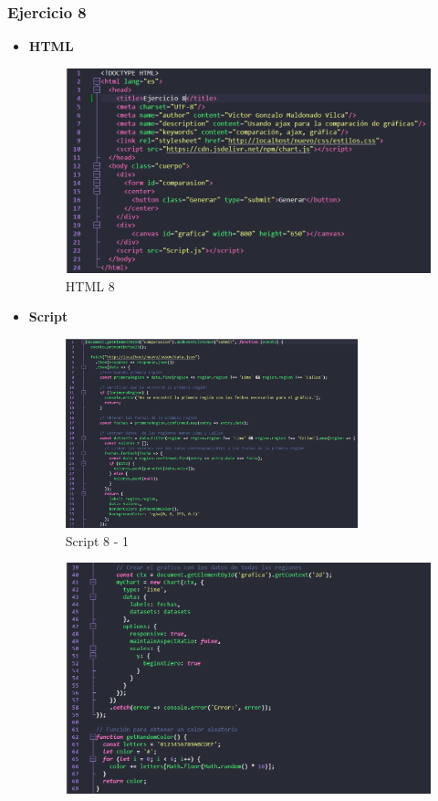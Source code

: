 \documentclass{article}
\begin{document}
	\subsubsection{Ejercicio 8}
	\begin{itemize}
		\item \textbf{HTML}
		\begin{figure}[H]
			\centering
			\includegraphics[width=1\textwidth,keepaspectratio]{img/html8.png}
			\caption{HTML 8}
		\end{figure}
		\item \textbf{Script}
		\begin{figure}[H]
			\centering
			\includegraphics[width=0.8\textwidth,keepaspectratio]{img/Script8-1.png}
			\caption{Script 8 - 1}
		\end{figure}
		\begin{figure}[H]
			\centering
			\includegraphics[width=1\textwidth,keepaspectratio]{img/Script8-2.png}

\end{figure}
\end{itemize}
\end{document}
